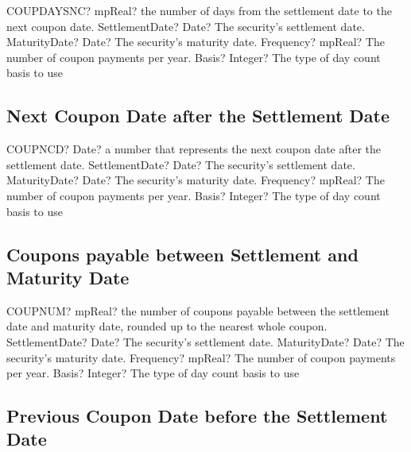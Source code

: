\begin{mpFunctionsExtract}
	\mpWorksheetFunctionFourNotImplemented
	{COUPDAYSNC? mpReal? the number of days from the settlement date to the next coupon date.}
	{SettlementDate? Date? The security's settlement date.}
	{MaturityDate? Date? The security's maturity date.}
	{Frequency? mpReal? The number of coupon payments per year.}
	{Basis? Integer?  The type of day count basis to use}
\end{mpFunctionsExtract}




\subsection{Next Coupon Date after the Settlement Date}

\begin{mpFunctionsExtract}
	\mpWorksheetFunctionFourNotImplemented
	{COUPNCD? Date? a number that represents the next coupon date after the settlement date.}
	{SettlementDate? Date? The security's settlement date.}
	{MaturityDate? Date? The security's maturity date.}
	{Frequency? mpReal? The number of coupon payments per year.}
	{Basis? Integer?  The type of day count basis to use}
\end{mpFunctionsExtract}





\subsection{Coupons payable between Settlement and Maturity Date}

\begin{mpFunctionsExtract}
	\mpWorksheetFunctionFourNotImplemented
	{COUPNUM? mpReal? the number of coupons payable between the settlement date and maturity date, rounded up to the nearest whole coupon.}
	{SettlementDate? Date? The security's settlement date.}
	{MaturityDate? Date? The security's maturity date.}
	{Frequency? mpReal? The number of coupon payments per year.}
	{Basis? Integer?  The type of day count basis to use}
\end{mpFunctionsExtract}





\subsection{Previous Coupon Date before the Settlement Date}

